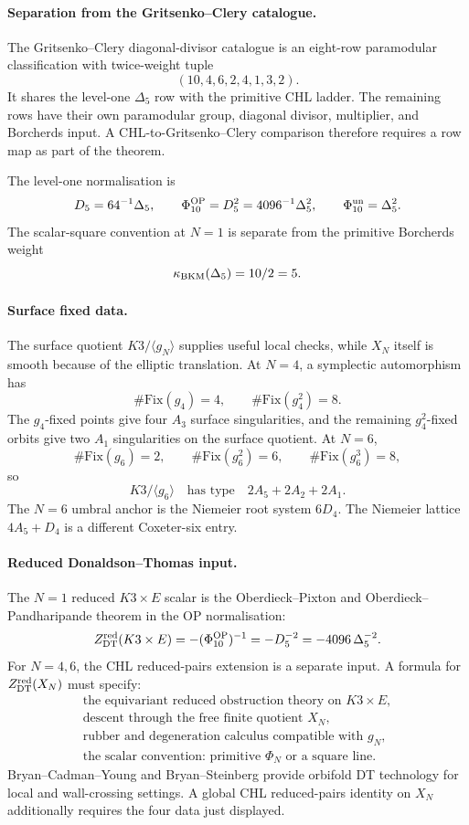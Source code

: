 \paragraph{Separation from the Gritsenko--Clery catalogue.}
The Gritsenko--Clery diagonal-divisor catalogue is an eight-row
paramodular classification with twice-weight tuple
\[
  (10,4,6,2,4,1,3,2).
\]
It shares the level-one \(\Delta_5\) row with the primitive CHL ladder.
The remaining rows have their own paramodular group, diagonal divisor,
multiplier, and Borcherds input.  A CHL-to-Gritsenko--Clery comparison
therefore requires a row map as part of the theorem.

The level-one normalisation is
\[
  D_5=64^{-1}\Delta_5,\qquad
  \Phi_{10}^{\mathrm{OP}}=D_5^2=4096^{-1}\Delta_5^2,\qquad
  \Phi_{10}^{\mathrm{un}}=\Delta_5^2.
\]
The scalar-square convention at \(N=1\) is separate from the primitive
Borcherds weight
\[
  \kappa_{\mathrm{BKM}}(\Delta_5)=10/2=5.
\]

\paragraph{Surface fixed data.}
The surface quotient \(K3/\langle g_N\rangle\) supplies useful local
checks, while \(X_N\) itself is smooth because of the elliptic
translation.  At \(N=4\), a symplectic automorphism has
\[
  \#\mathrm{Fix}(g_4)=4,\qquad \#\mathrm{Fix}(g_4^2)=8.
\]
The \(g_4\)-fixed points give four \(A_3\) surface singularities, and
the remaining \(g_4^2\)-fixed orbits give two \(A_1\) singularities on
the surface quotient.  At \(N=6\),
\[
  \#\mathrm{Fix}(g_6)=2,\qquad
  \#\mathrm{Fix}(g_6^2)=6,\qquad
  \#\mathrm{Fix}(g_6^3)=8,
\]
so
\[
  K3/\langle g_6\rangle
  \quad\text{has type}\quad
  2A_5+2A_2+2A_1.
\]
The \(N=6\) umbral anchor is the Niemeier root system \(6D_4\).  The
Niemeier lattice \(4A_5+D_4\) is a different Coxeter-six entry.

\paragraph{Reduced Donaldson--Thomas input.}
The \(N=1\) reduced \(K3\times E\) scalar is the Oberdieck--Pixton and
Oberdieck--Pandharipande theorem in the OP normalisation:
\[
  Z^{\mathrm{red}}_{\mathrm{DT}}(K3\times E)=-(\Phi_{10}^{\mathrm{OP}})^{-1}
  =-D_5^{-2}
  =-4096\,\Delta_5^{-2}.
\]
For \(N=4,6\), the CHL reduced-pairs extension is a separate input.  A
formula for \(Z^{\mathrm{red}}_{\mathrm{DT}}(X_N)\) must specify:
\[
\begin{gathered}
  \text{the equivariant reduced obstruction theory on }K3\times E,\\
  \text{descent through the free finite quotient }X_N,\\
  \text{rubber and degeneration calculus compatible with }g_N,\\
  \text{the scalar convention: primitive }\Phi_N\text{ or a square line.}
\end{gathered}
\]
Bryan--Cadman--Young and Bryan--Steinberg provide orbifold DT technology
for local and wall-crossing settings.  A global CHL reduced-pairs
identity on \(X_N\) additionally requires the four data just displayed.

